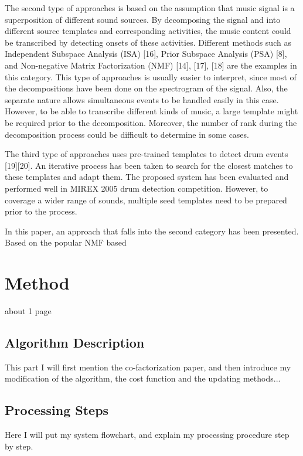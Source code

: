 \documentclass{article}
\begin{document}
The second type of approaches is based on the assumption that music signal is a superposition of different sound sources. By decomposing the signal and into different source templates and corresponding activities, the music content could be transcribed by detecting onsets of these activities. Different methods such as Independent Subspace Analysis (ISA) [16], Prior Subspace Analysis (PSA) [8], and Non-negative Matrix Factorization (NMF) [14], [17], [18] are the examples in this category. This type of approaches is usually easier to interpret, since most of the decompositions have been done on the spectrogram of the signal. Also, the separate nature allows simultaneous events to be handled easily in this case. However, to be able to transcribe different kinds of music, a large template might be required prior to the decomposition. Moreover, the number of rank during the decomposition process could be difficult to determine in some cases. 

The third type of approaches uses pre-trained templates to detect drum events [19][20]. An iterative process has been taken to search for the closest matches to these templates and adapt them. The proposed system has been evaluated and performed well in MIREX 2005 drum detection competition. However, to coverage a wider range of sounds, multiple seed templates need to be prepared prior to the process.

In this paper, an approach that falls into the second category has been presented. Based on the popular NMF based  
\section{Method}\label{sec:method}
about 1 page

\subsection{Algorithm Description}\label{subsec:algorithm description}

This part I will first mention the co-factorization paper, and then introduce my modification of the algorithm, the cost function and the updating methods...

\subsection{Processing Steps}\label{subsec:processing steps}

Here I will put my system flowchart, and explain my processing procedure step by step. 
\end{document}
